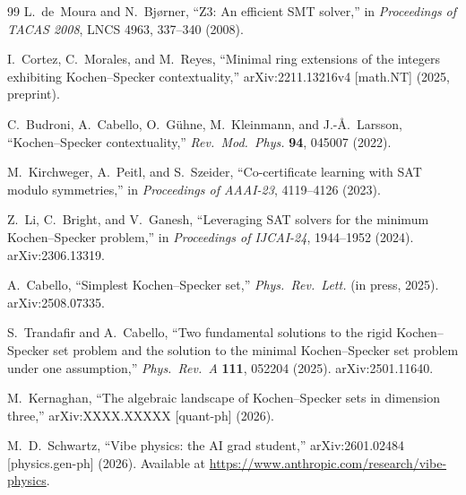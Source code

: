\documentclass[twocolumn,pra,superscriptaddress,nofootinbib]{revtex4-2}
\begin{document}
\begin{thebibliography}{99}
L.~de~Moura and N.~Bj{\o}rner,
``Z3: An efficient SMT solver,''
in \textit{Proceedings of TACAS 2008}, LNCS 4963, 337--340 (2008).

I.~Cortez, C.~Morales, and M.~Reyes,
``Minimal ring extensions of the integers exhibiting Kochen--Specker
contextuality,''
arXiv:2211.13216v4 [math.NT] (2025, preprint).

C.~Budroni, A.~Cabello, O.~G\"uhne, M.~Kleinmann, and J.-\AA.~Larsson,
``Kochen--Specker contextuality,''
\textit{Rev.\ Mod.\ Phys.} \textbf{94}, 045007 (2022).

M.~Kirchweger, A.~Peitl, and S.~Szeider,
``Co-certificate learning with SAT modulo symmetries,''
in \textit{Proceedings of AAAI-23}, 4119--4126 (2023).

Z.~Li, C.~Bright, and V.~Ganesh,
``Leveraging SAT solvers for the minimum Kochen--Specker problem,''
in \textit{Proceedings of IJCAI-24}, 1944--1952 (2024).
arXiv:2306.13319.

A.~Cabello,
``Simplest Kochen--Specker set,''
\textit{Phys.\ Rev.\ Lett.} (in press, 2025). arXiv:2508.07335.

S.~Trandafir and A.~Cabello,
``Two fundamental solutions to the rigid Kochen--Specker set problem and
the solution to the minimal Kochen--Specker set problem under one assumption,''
\textit{Phys.\ Rev.\ A} \textbf{111}, 052204 (2025). arXiv:2501.11640.

M.~Kernaghan,
``The algebraic landscape of Kochen--Specker sets in dimension three,''
arXiv:XXXX.XXXXX [quant-ph] (2026).

M.~D.~Schwartz,
``Vibe physics: the AI grad student,''
arXiv:2601.02484 [physics.gen-ph] (2026).
Available at \url{https://www.anthropic.com/research/vibe-physics}.

\end{thebibliography}
\end{document}
